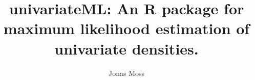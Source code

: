 \documentclass{standalone}
\begin{document}
\author
{
    Jonas Moss
}
\title{univariateML: An R package for maximum likelihood
estimation of univariate densities.}
\maketitle

\end{document}
